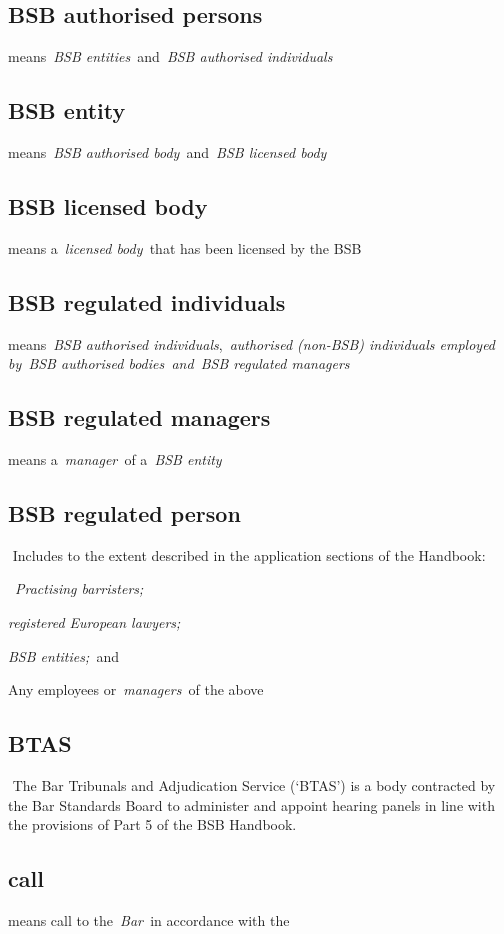  \subsection{BSB authorised persons } means~\emph{BSB
  entities~}and~\emph{BSB authorised individuals} \subsection{BSB entity } means~\emph{BSB authorised body~}and~\emph{BSB
  licensed body} \subsection{BSB licensed body } means a~\emph{licensed body~}that has
  been licensed by the BSB  \subsection{BSB regulated individuals } means~\emph{BSB authorised
  individuals},~\emph{authorised (non-BSB) individuals employed by~BSB
  authorised bodies~and~BSB regulated managers} \subsection{BSB regulated managers } means a~\emph{manager~}of
  a~\emph{BSB entity} \subsection{BSB regulated person } Includes to the extent described in
  the application sections of the Handbook: \al \item ~\emph{Practising
  barristers;}
  \item \emph{ registered European lawyers;}
  \item \emph{BSB
  entities;~}and
  \item Any employees or~\emph{managers~}of the above \la  \subsection{BTAS } The Bar Tribunals and Adjudication Service (`BTAS') is
  a body contracted by the Bar Standards Board to administer and appoint
  hearing panels in line with the provisions of Part 5 of the BSB
  Handbook.
    \subsection{call } means call to the~\emph{Bar~}in accordance with the
